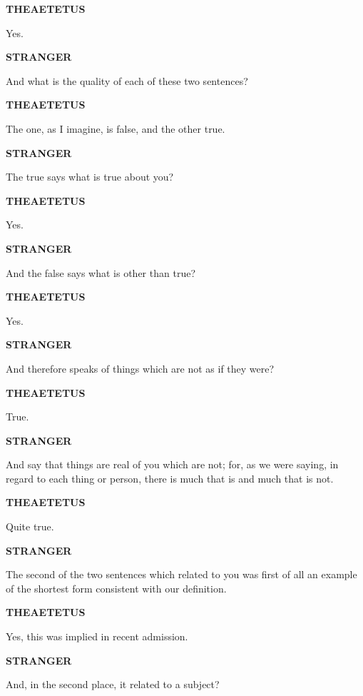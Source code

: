\documentclass[11pt,letter]{article}
\begin{document}
\par \textbf{THEAETETUS}
\par   Yes.

\par \textbf{STRANGER}
\par   And what is the quality of each of these two sentences?

\par \textbf{THEAETETUS}
\par   The one, as I imagine, is false, and the other true.

\par \textbf{STRANGER}
\par   The true says what is true about you?

\par \textbf{THEAETETUS}
\par   Yes.

\par \textbf{STRANGER}
\par   And the false says what is other than true?

\par \textbf{THEAETETUS}
\par   Yes.

\par \textbf{STRANGER}
\par   And therefore speaks of things which are not as if they were?

\par \textbf{THEAETETUS}
\par   True.

\par \textbf{STRANGER}
\par   And say that things are real of you which are not; for, as we were saying, in regard to each thing or person, there is much that is and much that is not.

\par \textbf{THEAETETUS}
\par   Quite true.

\par \textbf{STRANGER}
\par   The second of the two sentences which related to you was first of all an example of the shortest form consistent with our definition.

\par \textbf{THEAETETUS}
\par   Yes, this was implied in recent admission.

\par \textbf{STRANGER}
\par   And, in the second place, it related to a subject?
\end{document}
